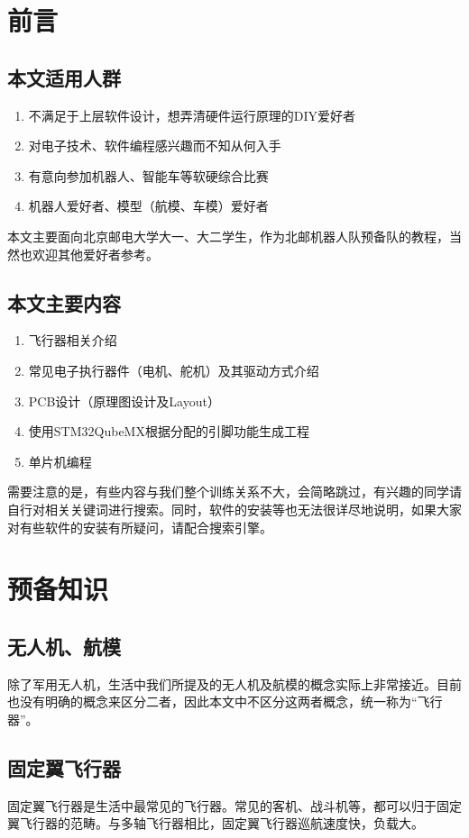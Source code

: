 \documentclass{article}
\begin{document}
	\author{北京邮电大学 机器人队}
	\tableofcontents
	\pagebreak
\section{前言}
\subsection{本文适用人群}

\begin{enumerate}
	\item 不满足于上层软件设计，想弄清硬件运行原理的DIY爱好者
	\item 对电子技术、软件编程感兴趣而不知从何入手
	\item 有意向参加机器人、智能车等软硬综合比赛
	\item 机器人爱好者、模型（航模、车模）爱好者
\end{enumerate}
本文主要面向北京邮电大学大一、大二学生，作为北邮机器人队预备队的教程，当然也欢迎其他爱好者参考。

\subsection{本文主要内容}
\begin{enumerate}
	\item 飞行器相关介绍
	\item 常见电子执行器件（电机、舵机）及其驱动方式介绍
	\item PCB设计（原理图设计及Layout）
	\item 使用STM32QubeMX根据分配的引脚功能生成工程
	\item 单片机编程
\end{enumerate}

需要注意的是，有些内容与我们整个训练关系不大，会简略跳过，有兴趣的同学请自行对相关关键词进行搜索。同时，软件的安装等也无法很详尽地说明，如果大家对有些软件的安装有所疑问，请配合搜索引擎。

\section{预备知识}
\subsection{无人机、航模}
除了军用无人机，生活中我们所提及的无人机及航模的概念实际上非常接近。目前也没有明确的概念来区分二者，因此本文中不区分这两者概念，统一称为“飞行器”。
\subsection{固定翼飞行器}
固定翼飞行器是生活中最常见的飞行器。常见的客机、战斗机等，都可以归于固定翼飞行器的范畴。与多轴飞行器相比，固定翼飞行器巡航速度快，负载大。
\end{document}
